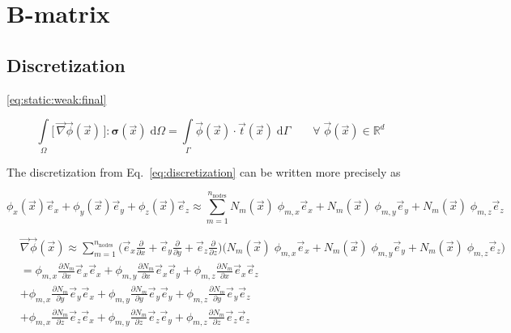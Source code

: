 \documentclass[times,namecite]{goose-article}
\begin{document}
\section{B-matrix}

\subsection{Discretization}

\eqref{eq:static:weak:final}

\begin{equation}
  \int\limits_\Omega
    \big[\, \vec{\nabla} \vec{\phi}(\vec{x}) \,\big] : \bm{\sigma}(\vec{x}) \;
  \mathrm{d}\Omega
  =
  \int\limits_\Gamma
    \vec{\phi}(\vec{x}) \cdot
    \vec{t}(\vec{x}) \;
  \mathrm{d}\Gamma
  \qquad
  \forall \; \vec{\phi}(\vec{x}) \in \mathbb{R}^d
\end{equation}

The discretization from Eq.~\eqref{eq:discretization} can be written more precisely as

\begin{equation}
  \phi_x(\vec{x}) \vec{e}_x +
  \phi_y(\vec{x}) \vec{e}_y +
  \phi_z(\vec{x}) \vec{e}_z
  \approx
  \sum_{m=1}^{n_\mathrm{nodes}}
  N_m (\vec{x}) \; \phi_{m,x} \vec{e}_x +
  N_m (\vec{x}) \; \phi_{m,y} \vec{e}_y +
  N_m (\vec{x}) \; \phi_{m,z} \vec{e}_z
\end{equation}


\begin{align}
  &
  \vec{\nabla} \vec{\phi}(\vec{x})
  \approx
  \sum_{m=1}^{n_\mathrm{nodes}}
  \bigg(
    \vec{e}_x \frac{\partial}{\partial x} +
    \vec{e}_y \frac{\partial}{\partial y} +
    \vec{e}_z \frac{\partial}{\partial z}
  \bigg)
  \bigg(
    N_m (\vec{x}) \; \phi_{m,x} \vec{e}_x +
    N_m (\vec{x}) \; \phi_{m,y} \vec{e}_y +
    N_m (\vec{x}) \; \phi_{m,z} \vec{e}_z
  \bigg)
  \\
  &
  =
  \phi_{m,x} \frac{\partial N_m}{\partial x} \vec{e}_x \vec{e}_x +
  \phi_{m,y} \frac{\partial N_m}{\partial x} \vec{e}_x \vec{e}_y +
  \phi_{m,z} \frac{\partial N_m}{\partial x} \vec{e}_x \vec{e}_z
  \\
  &
  +
  \phi_{m,x} \frac{\partial N_m}{\partial y} \vec{e}_y \vec{e}_x +
  \phi_{m,y} \frac{\partial N_m}{\partial y} \vec{e}_y \vec{e}_y +
  \phi_{m,z} \frac{\partial N_m}{\partial y} \vec{e}_y \vec{e}_z
  \\
  &
  +
  \phi_{m,x} \frac{\partial N_m}{\partial z} \vec{e}_z \vec{e}_x +
  \phi_{m,y} \frac{\partial N_m}{\partial z} \vec{e}_z \vec{e}_y +
  \phi_{m,z} \frac{\partial N_m}{\partial z} \vec{e}_z \vec{e}_z
\end{align}
\end{document}
